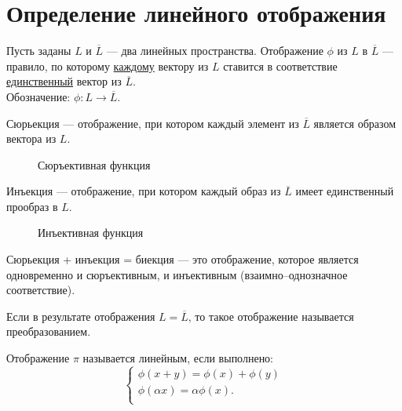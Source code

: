 \section{Определение линейного отображения}
\begin{definition}
Пусть заданы $L$ и $\overline{L}$ --- два линейных пространства. \textsf{Отображение} $\phi$ из $L$ в $\overline{L}$ --- правило, по которому \underline{каждому} вектору из $L$ ставится в соответствие \underline{единственный} вектор из $\overline{L}$.\\
Обозначение: $\phi: L\rightarrow\overline{L}$.
\end{definition}

\begin{definition}
\textsf{Сюрьекция} --- отображение, при котором каждый элемент из $\overline{L}$ является образом вектора из $L$.
\end{definition}

\begin{figure}[h!]
	\centering
	\def\svgwidth{5cm} %
	
	\caption{Сюръективная функция}
	\label{...}
\end{figure}

\begin{definition}
\textsf{Инъекция} --- отображение, при котором каждый образ из $\overline{L}$ имеет единственный прообраз в $L$.
\end{definition}

\begin{figure}[h!]
	\centering
	\def\svgwidth{5cm} %
	
	\caption{Инъективная функция}
	\label{...}
\end{figure}

\begin{definition}
Сюрьекция + инъекция = \textsf{биекция} --- это отображение, которое является одновременно и сюръективным, и инъективным (взаимно--однозначное соответствие).
\end{definition}

\begin{definition}
Если в результате отображения $L=\overline{L}$, то такое отображение называется \textsf{преобразованием}.
\end{definition}

\begin{definition}
Отображение $\pi$ называется \textsf{линейным}, если выполнено:
$$
\left\{
\begin{array}{l}
\phi(x+y)=\phi(x)+\phi(y)\\
\phi(\alpha x)=\alpha\phi(x).\\
\end{array}\right.
$$
\end{definition}

